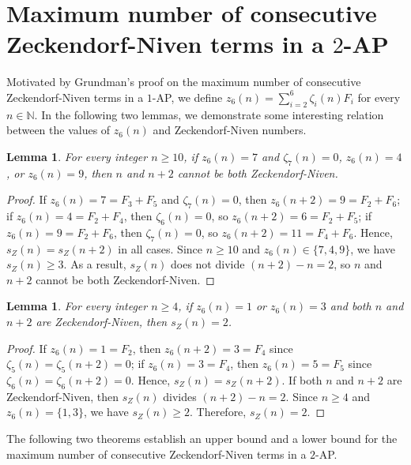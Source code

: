 \documentclass[12pt]{article}
\newtheorem{lemma}[theorem]{Lemma}
\theoremstyle{definition}
\newcommand{\N}{\mathbb{N}}
\begin{document}
\section{Maximum number of consecutive Zeckendorf-Niven terms in a $2$-AP}\label{sec:2AP}

Motivated by Grundman's proof \cite{g2007} on the maximum number of consecutive Zeckendorf-Niven terms in a $1$-AP, we define $z_6(n)=\sum_{i=2}^6\zeta_i(n)F_i$ for every $n\in\N$. In the following two lemmas, we demonstrate some interesting relation between the values of $z_6(n)$ and Zeckendorf-Niven numbers.

\begin{lemma}\label{lem:z6=4or9}
For every integer $n\geq10$, if $z_6(n)=7$ and $\zeta_7(n)=0$, $z_6(n)=4$, or $z_6(n)=9$, then $n$ and $n+2$ cannot be both Zeckendorf-Niven.
\end{lemma}
\begin{proof}
If $z_6(n)=7=F_3+F_5$ and $\zeta_7(n)=0$, then $z_6(n+2)=9=F_2+F_6$; if $z_6(n)=4=F_2+F_4$, then $\zeta_6(n)=0$, so $z_6(n+2)=6=F_2+F_5$; if $z_6(n)=9=F_2+F_6$, then $\zeta_7(n)=0$, so $z_6(n+2)=11=F_4+F_6$. Hence, $s_Z(n)=s_Z(n+2)$ in all cases. Since $n\geq10$ and $z_6(n)\in\{7,4,9\}$, we have $s_Z(n)\geq3$. As a result, $s_Z(n)$ does not divide $(n+2)-n=2$, so $n$ and $n+2$ cannot be both Zeckendorf-Niven.
\end{proof}

\begin{lemma}\label{lem:z6=1or3}
For every integer $n\geq4$, if $z_6(n)=1$ or $z_6(n)=3$ and both $n$ and $n+2$ are Zeckendorf-Niven, then $s_Z(n)=2$.
\end{lemma}
\begin{proof}
If $z_6(n)=1=F_2$, then $z_6(n+2)=3=F_4$ since $\zeta_5(n)=\zeta_5(n+2)=0$; if $z_6(n)=3=F_4$, then $z_6(n)=5=F_5$ since $\zeta_6(n)=\zeta_6(n+2)=0$. Hence, $s_Z(n)=s_Z(n+2)$. If both $n$ and $n+2$ are Zeckendorf-Niven, then $s_Z(n)$ divides $(n+2)-n=2$. Since $n\geq4$ and $z_6(n)=\{1,3\}$, we have $s_Z(n)\geq2$. Therefore, $s_Z(n)=2$.
\end{proof}

The following two theorems establish an upper bound and a lower bound for the maximum number of consecutive Zeckendorf-Niven terms in a $2$-AP.
\end{document}
